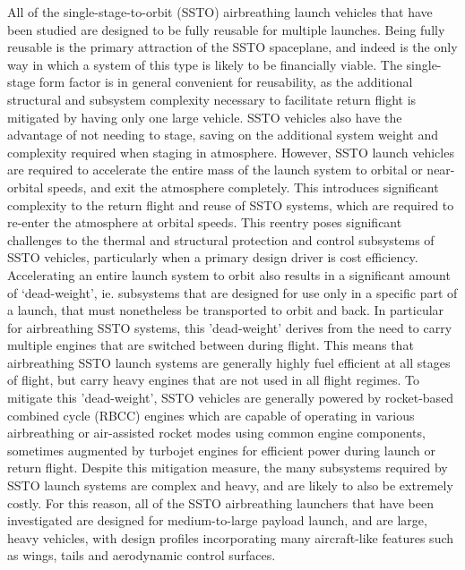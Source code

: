 All of the single-stage-to-orbit (SSTO) airbreathing launch vehicles that have been studied are designed to be fully reusable for multiple launches. Being fully reusable is the primary attraction of the SSTO spaceplane, and indeed is the only way in which a system of this type is likely to be financially viable. 
The single-stage form factor is in general convenient for reusability, as the additional structural and subsystem complexity necessary to facilitate return flight is mitigated by having only one large vehicle. SSTO vehicles also have the advantage of not needing to stage, saving on the additional system weight and complexity required when staging in atmosphere. 
However, SSTO launch vehicles are required to accelerate the entire mass of the launch system to orbital or near-orbital speeds, and exit the atmosphere completely. This introduces significant complexity to the return flight and reuse of SSTO systems, which are required to re-enter the atmosphere at orbital speeds\cite{NASP}. This reentry poses significant challenges to the thermal and structural protection and control subsystems of SSTO vehicles\cite{NASP}, particularly when a primary design driver is cost efficiency.
 Accelerating an entire launch system to orbit also results in a significant amount of `dead-weight', ie. subsystems that are designed for use only in a specific part of a launch, that must nonetheless be transported to orbit and back. In particular for airbreathing SSTO systems, this 'dead-weight' derives from the need to carry multiple engines that are switched between during flight\cite{NASP,WCC,Powell1991,Lu1993,Aberleen,Bradford2000, HyperX,Roche2000,Trefny1999,Young2006}. This means that airbreathing SSTO launch systems are generally highly fuel efficient at all stages of flight, but carry heavy engines that are not used in all flight regimes. 
To mitigate this 'dead-weight', SSTO vehicles are generally powered by rocket-based combined cycle (RBCC) engines which are capable of operating in various airbreathing or air-assisted rocket modes using common engine components, sometimes augmented by turbojet engines for efficient power during launch or return flight\cite{NASP,WCC,Powell1991,Lu1993,Aberleen,Bradford2000, HyperX,Roche2000,Trefny1999,Young2006}. Despite this mitigation measure, the many subsystems required by SSTO launch systems are complex and heavy, and are likely to also be extremely costly.
For this reason, all of the SSTO airbreathing launchers that have been investigated are designed for medium-to-large payload launch, and are large, heavy vehicles, with design profiles incorporating many aircraft-like features such as wings, tails and aerodynamic control surfaces\cite{NASP,WCC,Powell1991,Lu1993,Aberleen,Bradford2000, HyperX,Roche2000,Trefny1999,Young2006}. 


